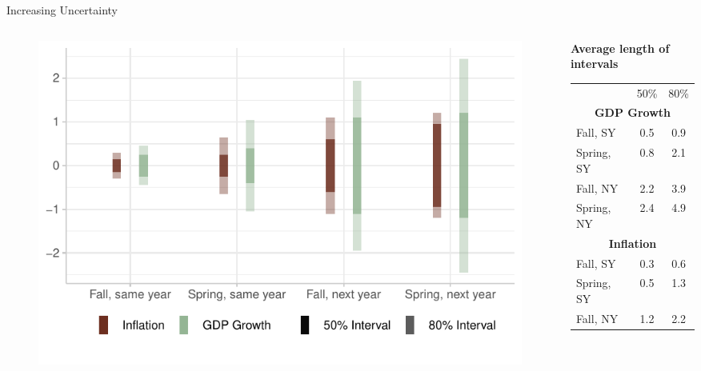 \documentclass[en]{sdqbeamer}
\begin{document}
\begin{frame}{Increasing Uncertainty}

\begin{columns}
\begin{column}{0.6\textwidth}
    \begin{figure}
        \centering
        \includegraphics[width=\textwidth]{figures/horizon_uncc.pdf}
        \label{fig:enter-label}
    \end{figure}
\end{column}
\begin{column}{0.4\textwidth}
\centering
\textbf{Average length of intervals}
\begin{table}
\begin{tabular}{ l c c }
&   50\%  & 80\%\\[0.3em]
\multicolumn{3}{c}{\textbf{GDP Growth}}\\
Fall,  SY & 0.5 & 0.9\\ 
Spring, SY &0.8 &2.1 \\ 
Fall, NY & 2.2 & 3.9\\ 
Spring, NY &2.4 &4.9 \\[0.3em] 
\multicolumn{3}{c}{\textbf{Inflation}}\\
Fall,  SY & 0.3 & 0.6\\ 
Spring, SY &0.5 &1.3 \\ 
Fall, NY & 1.2 & 2.2\\ 

\end{tabular}
\end{table}
\end{column}
\end{columns}
\end{frame}
\end{document}
